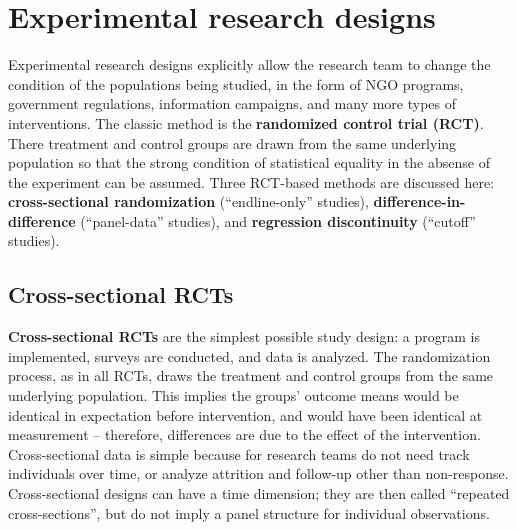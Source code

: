 
\section{Experimental research designs}

Experimental research designs explicitly allow the research team
to change the condition of the populations being studied,
in the form of NGO programs, government regulations,
information campaigns, and many more types of interventions.\cite{banerjee2009experimental}
The classic method is the \textbf{randomized control trial (RCT)}.
There treatment and control groups are drawn from the same underlying population
so that the strong condition of statistical equality
in the absense of the experiment can be assumed.
Three RCT-based methods are discussed here:
\textbf{cross-sectional randomization} (``endline-only'' studies),
\textbf{difference-in-difference} (``panel-data'' studies),
and \textbf{regression discontinuity} (``cutoff'' studies).

\subsection{Cross-sectional RCTs}

\textbf{Cross-sectional RCTs} are the simplest possible study design:
a program is implemented, surveys are conducted, and data is analyzed.
The randomization process, as in all RCTs,
draws the treatment and control groups from the same underlying population.
This implies the groups' outcome means would be identical in expectation
before intervention, and would have been identical at measurement --
therefore, differences are due to the effect of the intervention.
Cross-sectional data is simple because
for research teams do not need track individuals over time,
or analyze attrition and follow-up other than non-response.
Cross-sectional designs can have a time dimension;
they are then called ``repeated cross-sections'',
but do not imply a panel structure for individual observations.

